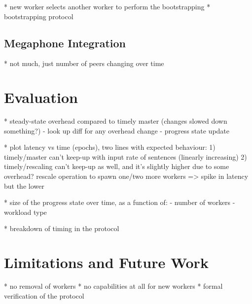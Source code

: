 \documentclass[12pt]{extarticle}
\begin{document}
* new worker selects another worker to perform the bootstrapping
* bootstrapping protocol

\subsection{Megaphone Integration}

* not much, just number of peers changing over time

\section{Evaluation}

* steady-state overhead compared to timely master (changes slowed down something?)
   - look up diff for any overhead change
   - progress state update

* plot latency vs time (epochs), two lines with expected behaviour:
    1) timely/master can't keep-up with input rate of sentences (linearly increasing)
    2) timely/rescaling can't keep-up as well, and it's slightly higher due to some overhead?
       rescale operation to spawn one/two more workers => spike in latency but the lower

* size of the progress state over time, as a function of:
  - number of workers
  - workload type

* breakdown of timing in the protocol

\section{Limitations and Future Work}

* no removal of workers
* no capabilities at all for new workers
* formal verification of the protocol
\end{document}
